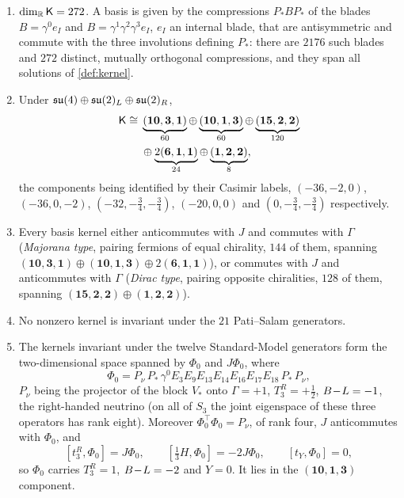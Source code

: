 \begin{theorem}
\label{thm:kernelspace}
\begin{enumerate}[label=(\roman*),leftmargin=2.2em]
\item $\dim_{\mathbb{R}}\mathsf K=272$. A basis is given by the compressions $P_*BP_*$ of the blades $B=\gamma^0e_I$ and $B=\gamma^1\gamma^2\gamma^3e_I$, $e_I$ an
internal blade, that are antisymmetric and commute with the three involutions defining $P_*$: there are $2176$ such blades and $272$ distinct,
mutually orthogonal compressions, and they span all solutions of \cref{def:kernel}.
\item Under $\mathfrak{su}(4)\oplus\mathfrak{su}(2)_L\oplus\mathfrak{su}(2)_R$,
\[
\begin{aligned}
\mathsf K\cong{}&\underbrace{(\mathbf{10},\mathbf3,\mathbf1)}_{60}\oplus\underbrace{(\mathbf{10},\mathbf1,\mathbf3)}_{60}\oplus\underbrace{(\mathbf{15},\mathbf2,\mathbf2)}_{120}\\
&\oplus\underbrace{2(\mathbf6,\mathbf1,\mathbf1)}_{24}\oplus\underbrace{(\mathbf1,\mathbf2,\mathbf2)}_{8},
\end{aligned}
\]
the components being identified by their Casimir labels, $(-36,-2,0)$, $(-36,0,-2)$, $(-32,-\tfrac34,-\tfrac34)$, $(-20,0,0)$ and
$(0,-\tfrac34,-\tfrac34)$ respectively.
\item Every basis kernel either anticommutes with $J$ and commutes with $\Gamma$ (\emph{Majorana type}, pairing fermions of equal chirality, $144$ of
them, spanning $(\mathbf{10},\mathbf3,\mathbf1)\oplus(\mathbf{10},\mathbf1,\mathbf3)\oplus2(\mathbf6,\mathbf1,\mathbf1)$), or commutes with $J$ and anticommutes with
$\Gamma$ (\emph{Dirac type}, pairing opposite chiralities, $128$ of them, spanning $(\mathbf{15},\mathbf2,\mathbf2)\oplus(\mathbf1,\mathbf2,\mathbf2)$).
\item No nonzero kernel is invariant under the $21$ Pati--Salam generators.
\item The kernels invariant under the twelve Standard-Model generators form the two-dimensional space spanned by $\Phi_0$ and $J\Phi_0$, where
\begin{equation}
\label{eq:Phi0}
\Phi_0=P_\nu\,P_*\,\gamma^0E_3E_9E_{13}E_{14}E_{16}E_{17}E_{18}\,P_*\,P_\nu ,
\end{equation}
$P_\nu$ being the projector of the block $V_*$ onto $\Gamma=+1$, $T^R_3=+\tfrac12$, $B\!-\!L=-1$, the right-handed neutrino (on all of $S_3$
the joint eigenspace of these three operators has rank eight). Moreover $\Phi_0^{\!\top}\Phi_0=P_\nu$, of rank
four, $J$ anticommutes with $\Phi_0$, and
\[
[t^R_3,\Phi_0]=J\Phi_0,\qquad [\tfrac13H,\Phi_0]=-2J\Phi_0,\qquad [t_Y,\Phi_0]=0,
\]
so $\Phi_0$ carries $T^R_3=1$, $B\!-\!L=-2$ and $Y=0$. It lies in the $(\mathbf{10},\mathbf1,\mathbf3)$ component.
\end{enumerate}
\end{theorem}

